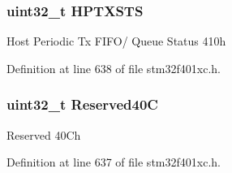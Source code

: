 \subsubsection[{\texorpdfstring{H\+P\+T\+X\+S\+TS}{HPTXSTS}}]{ uint32\+\_\+t H\+P\+T\+X\+S\+TS}\hypertarget{struct_u_s_b___o_t_g___host_type_def_a3903a00940c32a9f09889e08881e7a6a}{}\label{struct_u_s_b___o_t_g___host_type_def_a3903a00940c32a9f09889e08881e7a6a}
Host Periodic Tx F\+I\+F\+O/ Queue Status 410h 

Definition at line 638 of file stm32f401xc.\+h.

\subsubsection[{\texorpdfstring{Reserved40C}{Reserved40C}}]{\setlength{\rightskip}{0pt plus 5cm}uint32\+\_\+t Reserved40C}\hypertarget{struct_u_s_b___o_t_g___host_type_def_af66e42cdb83dc2eb156dfbbf42890f79}{}\label{struct_u_s_b___o_t_g___host_type_def_af66e42cdb83dc2eb156dfbbf42890f79}
Reserved 40\+Ch 

Definition at line 637 of file stm32f401xc.\+h.



